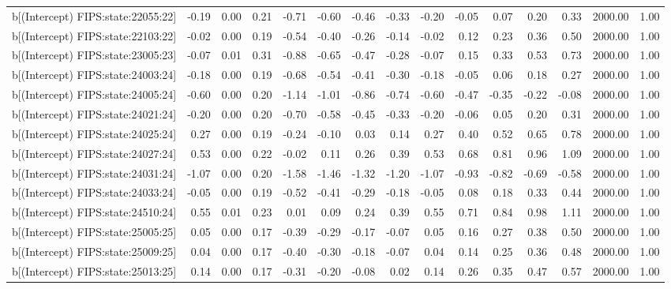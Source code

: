\begin{table}[ht]
\begin{tabular}{rrrrrrrrrrrrrrr}
  b[(Intercept) FIPS:state:22055:22] & -0.19 & 0.00 & 0.21 & -0.71 & -0.60 & -0.46 & -0.33 & -0.20 & -0.05 & 0.07 & 0.20 & 0.33 & 2000.00 & 1.00 \\ 
  b[(Intercept) FIPS:state:22103:22] & -0.02 & 0.00 & 0.19 & -0.54 & -0.40 & -0.26 & -0.14 & -0.02 & 0.12 & 0.23 & 0.36 & 0.50 & 2000.00 & 1.00 \\ 
  b[(Intercept) FIPS:state:23005:23] & -0.07 & 0.01 & 0.31 & -0.88 & -0.65 & -0.47 & -0.28 & -0.07 & 0.15 & 0.33 & 0.53 & 0.73 & 2000.00 & 1.00 \\ 
  b[(Intercept) FIPS:state:24003:24] & -0.18 & 0.00 & 0.19 & -0.68 & -0.54 & -0.41 & -0.30 & -0.18 & -0.05 & 0.06 & 0.18 & 0.27 & 2000.00 & 1.00 \\ 
  b[(Intercept) FIPS:state:24005:24] & -0.60 & 0.00 & 0.20 & -1.14 & -1.01 & -0.86 & -0.74 & -0.60 & -0.47 & -0.35 & -0.22 & -0.08 & 2000.00 & 1.00 \\ 
  b[(Intercept) FIPS:state:24021:24] & -0.20 & 0.00 & 0.20 & -0.70 & -0.58 & -0.45 & -0.33 & -0.20 & -0.06 & 0.05 & 0.20 & 0.31 & 2000.00 & 1.00 \\ 
  b[(Intercept) FIPS:state:24025:24] & 0.27 & 0.00 & 0.19 & -0.24 & -0.10 & 0.03 & 0.14 & 0.27 & 0.40 & 0.52 & 0.65 & 0.78 & 2000.00 & 1.00 \\ 
  b[(Intercept) FIPS:state:24027:24] & 0.53 & 0.00 & 0.22 & -0.02 & 0.11 & 0.26 & 0.39 & 0.53 & 0.68 & 0.81 & 0.96 & 1.09 & 2000.00 & 1.00 \\ 
  b[(Intercept) FIPS:state:24031:24] & -1.07 & 0.00 & 0.20 & -1.58 & -1.46 & -1.32 & -1.20 & -1.07 & -0.93 & -0.82 & -0.69 & -0.58 & 2000.00 & 1.00 \\ 
  b[(Intercept) FIPS:state:24033:24] & -0.05 & 0.00 & 0.19 & -0.52 & -0.41 & -0.29 & -0.18 & -0.05 & 0.08 & 0.18 & 0.33 & 0.44 & 2000.00 & 1.00 \\ 
  b[(Intercept) FIPS:state:24510:24] & 0.55 & 0.01 & 0.23 & 0.01 & 0.09 & 0.24 & 0.39 & 0.55 & 0.71 & 0.84 & 0.98 & 1.11 & 2000.00 & 1.00 \\ 
  b[(Intercept) FIPS:state:25005:25] & 0.05 & 0.00 & 0.17 & -0.39 & -0.29 & -0.17 & -0.07 & 0.05 & 0.16 & 0.27 & 0.38 & 0.50 & 2000.00 & 1.00 \\ 
  b[(Intercept) FIPS:state:25009:25] & 0.04 & 0.00 & 0.17 & -0.40 & -0.30 & -0.18 & -0.07 & 0.04 & 0.14 & 0.25 & 0.36 & 0.48 & 2000.00 & 1.00 \\ 
  b[(Intercept) FIPS:state:25013:25] & 0.14 & 0.00 & 0.17 & -0.31 & -0.20 & -0.08 & 0.02 & 0.14 & 0.26 & 0.35 & 0.47 & 0.57 & 2000.00 & 1.00 \\ 

\end{tabular}
\end{table}
